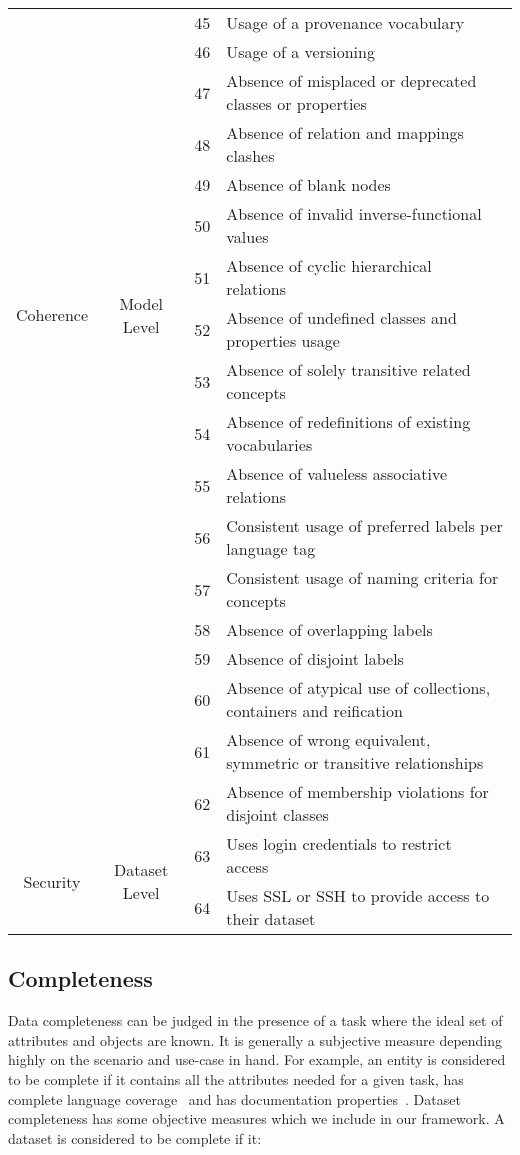 \begin{center}
{\begin{longtable}[h]{|c|c|c|l|}
\cline{3-4}
 &  & 45 & Usage of a provenance vocabulary\tabularnewline
 \cline{3-4}
 &  & 46 & Usage of a versioning\tabularnewline
\hline
\hline
\multirow{10}{*}{Coherence} & \multirow{10}{*}{Model Level} & 47 & Absence of misplaced or deprecated classes or properties ~\cite{Hogan:LDOW:10}\tabularnewline
\cline{3-4}
 &  & 48 & Absence of relation and mappings clashes ~\cite{Suominen:IKEM:12}\tabularnewline
\cline{3-4}
 &  & 49 & Absence of blank nodes~\cite{Hogan:WebSemJorunal:12}\tabularnewline
\cline{3-4}
 &  & 50 & Absence of invalid inverse-functional values~\cite{Hogan:LDOW:10}\tabularnewline
\cline{3-4}
 &  & 51 & Absence of cyclic hierarchical relations~\cite{Dagobert:DL:02,Suominen:IKEM:12,Mader:TBDL:12}\tabularnewline
\cline{3-4}
 &  & 52 & Absence of undefined classes and properties usage~\cite{Hogan:LDOW:10}\tabularnewline
\cline{3-4}
 &  & 53 & Absence of solely transitive related concepts~\cite{Mader:TBDL:12}\tabularnewline
\cline{3-4}
 &  & 54 & Absence of redefinitions of existing vocabularies ~\cite{Hogan:LDOW:10}\tabularnewline
\cline{3-4}
 &  & 55 & Absence of valueless associative relations ~\cite{Mader:TBDL:12}\tabularnewline
\hline
\hline
\multirow{7}{*}{Consistency}
 & \multirow{7}{*}{Model Level}
& 56 & Consistent usage of preferred labels per language tag~\cite{Isaac:W3C:09,Mader:TBDL:12}\tabularnewline
 \cline{3-4}
 & & 57 & Consistent usage of naming criteria for concepts~\cite{Maria:KEOD:13}\tabularnewline
\cline{3-4}
 &  & 58 & Absence of overlapping labels\tabularnewline
\cline{3-4}
 &  & 59 & Absence of disjoint labels~\cite{Mader:TBDL:12}\tabularnewline
\cline{3-4}
 & & 60 & Absence of atypical use of collections, containers and reification~\cite{Hogan:LDOW:10}\tabularnewline
\cline{3-4}
 &  & 61 & Absence of wrong equivalent, symmetric or transitive relationships~\cite{Maria:KEOD:13}\tabularnewline
\cline{3-4}
 &  & 62 & Absence of membership violations for disjoint classes~\cite{Hogan:LDOW:10}\tabularnewline
\hline
\hline
\multirow{2}{*}{Security} & \multirow{2}{*}{Dataset Level} & 63 & Uses login credentials to restrict access~\cite{Zaveri:SemWebJorunal:12}\tabularnewline
\cline{3-4}
 &  & 64 & Uses SSL or SSH to provide access to their dataset~\cite{Zaveri:SemWebJorunal:12}\tabularnewline
\hline
\end{longtable}
}
\end{center}

\subsection{Completeness}
Data completeness can be judged in the presence of a task where the ideal set of attributes and objects are known. It is generally a subjective measure depending highly on the scenario and use-case in hand. For example, an entity is considered to be complete if it contains all the attributes needed for a given task, has complete language coverage~\cite{Mader:TBDL:12} and has documentation properties~\cite{Miles:W3C:09,Mader:TBDL:12}. Dataset completeness has some objective measures which we include in our framework. A dataset is considered to be complete if it:

